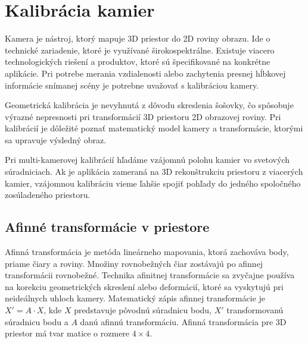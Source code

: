 \chapter{Kalibrácia kamier} 
\label{kap:kalibracia}
\pagestyle{fancy}
\fancyhf{}
\fancyfoot[CE,CO]{\thepage}
\renewcommand{\footrulewidth}{1pt}


Kamera je nástroj, ktorý mapuje 3D priestor do 2D roviny obrazu. Ide o technické zariadenie, ktoré je využívané širokospektrálne. Existuje viacero technologických riešení a produktov, ktoré sú špecifikované na konkrétne aplikácie. Pri potrebe merania vzdialenosti alebo zachytenia presnej hĺbkovej informácie snímanej scény je potrebne uvažovať s kalibráciou kamery. 

Geometrická kalibrácia je nevyhnutá z dôvodu skreslenia šošovky, čo spôsobuje výrazné nepresnosti pri transformácií 3D priestoru 2D obrazovej roviny. Pri kalibrácií je dôležité poznať matematický model kamery a transformácie, ktorými sa upravuje výsledný obraz. 

Pri multi-kamerovej kalibrácií hľadáme vzájomnú polohu kamier vo svetových súradniciach. Ak je aplikácia zameraná na 3D rekonštrukciu priestoru z viacerých kamier, vzájomnou kalibráciu vieme ľahšie spojiť pohľady do jedného spoločného zosúladeného priestoru. 


\section{Afinné transformácie v priestore}
\label{sec:afine}


Afinná transformácia je metóda lineárneho mapovania, ktorá zachováva body, priame čiary a roviny. Množiny rovnobežných čiar zostávajú po afinnej transformácii rovnobežné. Technika afinitnej transformácie sa zvyčajne používa na korekciu geometrických skreslení alebo deformácií, ktoré sa vyskytujú pri neideálnych uhloch kamery. Matematický zápis afinnej transformácie je $X'=A\cdot X$, kde $X$ predstavuje pôvodnú súradnicu bodu, $X'$ transformovanú súradnicu bodu a $A$ danú afinnú transformáciu. Afinná transformácia pre 3D priestor má tvar matice o rozmere $4\times 4$.\newline

